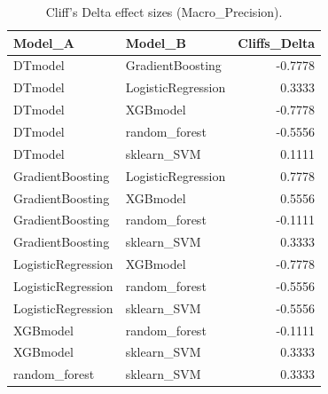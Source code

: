 \begin{table}[t]
\centering
\begin{tabular}{llr}
\toprule
Model_A & Model_B & Cliffs_Delta \\
\midrule
DTmodel & GradientBoosting & -0.7778 \\
DTmodel & LogisticRegression & 0.3333 \\
DTmodel & XGBmodel & -0.7778 \\
DTmodel & random_forest & -0.5556 \\
DTmodel & sklearn_SVM & 0.1111 \\
GradientBoosting & LogisticRegression & 0.7778 \\
GradientBoosting & XGBmodel & 0.5556 \\
GradientBoosting & random_forest & -0.1111 \\
GradientBoosting & sklearn_SVM & 0.3333 \\
LogisticRegression & XGBmodel & -0.7778 \\
LogisticRegression & random_forest & -0.5556 \\
LogisticRegression & sklearn_SVM & -0.5556 \\
XGBmodel & random_forest & -0.1111 \\
XGBmodel & sklearn_SVM & 0.3333 \\
random_forest & sklearn_SVM & 0.3333 \\
\bottomrule
\end{tabular}
\caption{Cliff's Delta effect sizes (Macro_Precision).}
\label{tab:cliffs_Macro_Precision}
\end{table}